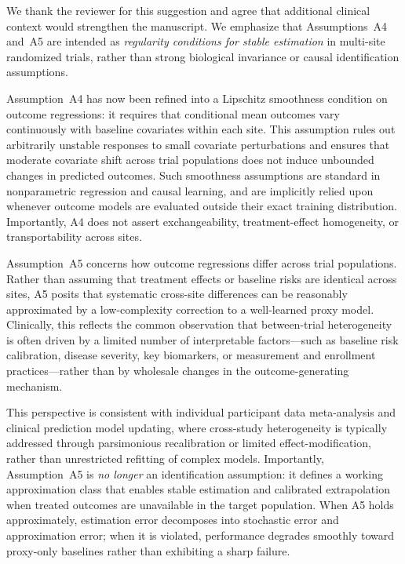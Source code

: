 {\color{blue}
We thank the reviewer for this suggestion and agree that additional clinical context would strengthen the manuscript. 
We emphasize that Assumptions~A4 and~A5 are intended as \emph{regularity conditions for stable estimation} in multi-site randomized trials, rather than strong biological invariance or causal identification assumptions.

Assumption~A4 has now been refined into a Lipschitz smoothness condition on outcome regressions: it requires that conditional mean outcomes vary continuously with baseline covariates within each site. 
This assumption rules out arbitrarily unstable responses to small covariate perturbations and ensures that moderate covariate shift across trial populations does not induce unbounded changes in predicted outcomes. 
Such smoothness assumptions are standard in nonparametric regression and causal learning, and are implicitly relied upon whenever outcome models are evaluated outside their exact training distribution.
Importantly, A4 does not assert exchangeability, treatment-effect homogeneity, or transportability across sites.

Assumption~A5 concerns how outcome regressions differ across trial populations. 
Rather than assuming that treatment effects or baseline risks are identical across sites, A5 posits that systematic cross-site differences can be reasonably approximated by a low-complexity correction to a well-learned proxy model. 
Clinically, this reflects the common observation that between-trial heterogeneity is often driven by a limited number of interpretable factors—such as baseline risk calibration, disease severity, key biomarkers, or measurement and enrollment practices—rather than by wholesale changes in the outcome-generating mechanism.

This perspective is consistent with individual participant data meta-analysis and clinical prediction model updating, where cross-study heterogeneity is typically addressed through parsimonious recalibration or limited effect-modification, rather than unrestricted refitting of complex models.
Importantly, Assumption~A5 is \emph{no longer} an identification assumption: it defines a working approximation class that enables stable estimation and calibrated extrapolation when treated outcomes are unavailable in the target population. 
When A5 holds approximately, estimation error decomposes into stochastic error and approximation error; when it is violated, performance degrades smoothly toward proxy-only baselines rather than exhibiting a sharp failure.
}


